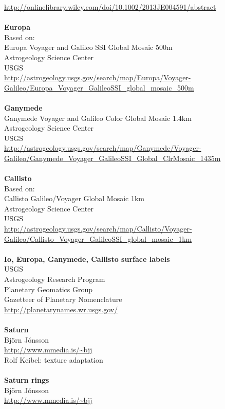 \documentclass[Orbiter User Manual.tex]{subfiles}
\begin{document}
\url{http://onlinelibrary.wiley.com/doi/10.1002/2013JE004591/abstract}\\
\\
\textbf{Europa}\\
Based on:\\
Europa Voyager and Galileo SSI Global Mosaic 500m\\
Astrogeology Science Center\\
USGS\\
\url{http://astrogeology.usgs.gov/search/map/Europa/Voyager-Galileo/Europa_Voyager_GalileoSSI_global_mosaic_500m}\\
\\
\textbf{Ganymede}\\
Ganymede Voyager and Galileo Color Global Mosaic 1.4km\\
Astrogeology Science Center\\
USGS\\
\url{http://astrogeology.usgs.gov/search/map/Ganymede/Voyager-Galileo/Ganymede_Voyager_GalileoSSI_Global_ClrMosaic_1435m}\\
\\
\textbf{Callisto}\\
Based on:\\
Callisto Galileo/Voyager Global Mosaic 1km\\
Astrogeology Science Center\\
USGS\\
\url{http://astrogeology.usgs.gov/search/map/Callisto/Voyager-Galileo/Callisto_Voyager_GalileoSSI_global_mosaic_1km}\\
\\
\textbf{Io, Europa, Ganymede, Callisto surface labels}\\
USGS\\
Astrogeology Research Program\\
Planetary Geomatics Group\\
Gazetteer of Planetary Nomenclature\\
\url{http://planetarynames.wr.usgs.gov/}\\
\\
\textbf{Saturn}\\
Björn Jónsson\\
\url{http://www.mmedia.is/~bjj}\\
Rolf Keibel: texture adaptation\\
\\
\textbf{Saturn rings}\\
Björn Jónsson\\
\url{http://www.mmedia.is/~bjj}\\
\end{document}
